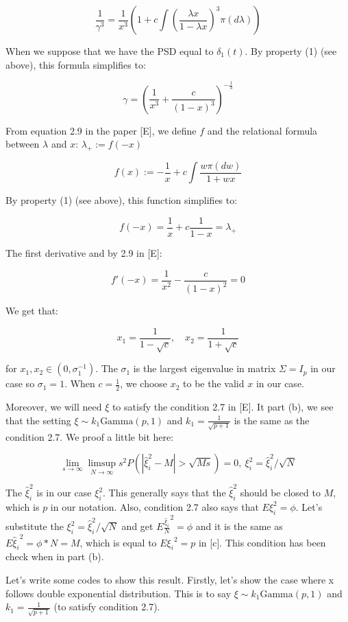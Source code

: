 \documentclass[
]{article}
\begin{document}
\[
\frac{1}{\gamma^3} = \frac{1}{x^3} \left(1 + c\int (\frac{\lambda x}{1 - \lambda x})^3  \pi(d\lambda)\right)
\]

When we suppose that we have the PSD equal to \(\delta_1(t)\). By
property (1) (see above), this formula simplifies to:

\[
\gamma = \left(\frac{1}{x^3} + \frac{c}{(1-x)^3} \right)^{-\frac{1}{3}}
\]

From equation 2.9 in the paper {[}E{]}, we define \(f\) and the
relational formula between \(\lambda\) and \(x\): \(\lambda_+ := f(−x)\)

\[
f(x) := -\frac{1}{x} + c \int \frac{w\pi(dw)}{1 + wx}
\]

By property (1) (see above), this function simplifies to:

\[
f(-x) = \frac{1}{x} + c \frac{1}{1-x} = \lambda_+
\]

The first derivative and by 2.9 in {[}E{]}:

\[
f'(-x) = \frac{1}{x^2} - \frac{c}{(1-x)^2} = 0
\]

We get that:

\[
x_1 = \frac{1}{1-\sqrt c}, \quad x_2 = \frac{1}{1+\sqrt c}
\]

for \(x_1, x_2 \in (0, \sigma_1^{-1})\). The \(\sigma_1\) is the largest
eigenvalue in matrix \(\Sigma = I_p\) in our case so \(\sigma_1 = 1\).
When \(c=\frac{1}{2}\), we choose \(x_2\) to be the valid \(x\) in our
case.

Moreover, we will need \(\xi\) to satisfy the condition 2.7 in {[}E{]}.
It part (b), we see that the setting \(\xi \sim k_1 \text{Gamma}(p, 1)\)
and \(k_1 = \frac{1}{\sqrt{p + 1}}\) is the same as the condition 2.7.
We proof a little bit here:

\[
\lim_{s \to \infty} \limsup_{N \to \infty} s^2 P\left(|\hat{\xi}^2_i - M| > \sqrt{Ms}\right) = 0, \ \xi_i^2 = \hat\xi_i^2/ \sqrt N
\]

The \(\hat\xi_i^2\) is in our case \(\xi_i^2\). This generally says that
the \(\hat\xi_i^2\) should be closed to \(M\), which is \(p\) in our
notation. Also, condition 2.7 also says that \(E\xi_i^2 = \phi\). Let's
substitute the \(\xi_i^2 = \hat\xi_i^2/ \sqrt N\) and get
\(E\frac{\hat\xi_i}{N}^2 = \phi\) and it is the same as
\(E{\hat\xi_i}^2 = \phi*N = M\), which is equal to \(E{\xi_i}^2 = p\) in
{[}c{]}. This condition has been check when in part (b).

Let's write some codes to show this result. Firstly, let's show the case
where x follows double exponential distribution. This is to say
\(\xi \sim k_1 \text{Gamma}(p, 1)\) and \(k_1 = \frac{1}{\sqrt{p + 1}}\)
(to satisfy condition 2.7).
\end{document}
